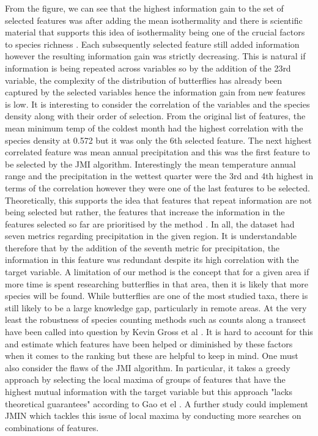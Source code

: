 \documentclass[prl,showpacs,superscriptaddress,twocolumn,longbibliography]{revtex4-1}
\begin{document}
From the figure, we can see that the highest information gain to the set of selected features was after adding the mean isothermality and there is scientific material that supports this idea of isothermality being one of the crucial factors to species richness \cite{rueda-m_environmental_2021}. Each subsequently selected feature still added information however the resulting information gain was strictly decreasing. This is natural if information is being repeated across variables so by the addition of the 23rd variable, the complexity of the distribution of butterflies has already been captured by the selected variables hence the information gain from new features is low. 
\newline
\newline
It is interesting to consider the correlation of the variables and the species density along with their order of selection. From the original list of features, the mean minimum temp of the coldest month had the highest correlation with the species density at 0.572 but it was only the 6th selected feature. The next highest correlated feature was mean annual precipitation and this was the first feature to be selected by the JMI algorithm. Interestingly the mean temperature annual range and the precipitation in the wettest quarter were the 3rd and 4th highest in terms of the correlation however they were one of the last features to be selected. Theoretically, this supports the idea that features that repeat information are not being selected but rather, the features that increase the information in the features selected so far are prioritised by the method \cite{afshar_dimensionality_2021}. In all, the dataset had seven metrics regarding precipitation in the given region. It is understandable therefore that by the addition of the seventh metric for precipitation, the information in this feature was redundant despite its high correlation with the target variable.
\newline
\newline
A limitation of our method is the concept that for a given area if more time is spent researching butterflies in that area, then it is likely that more species will be found. While butterflies are one of the most studied taxa, there is still likely to be a large knowledge gap, particularly in remote areas. At the very least the robustness of species counting methods such as counts along a transect have been called into question by Kevin Gross et al \cite{gross_robustness_2007}. It is hard to account for this and estimate which features have been helped or diminished by these factors when it comes to the ranking but these are helpful to keep in mind.  
\newline
\newline
One must also consider the flaws of the JMI algorithm. In particular, it takes a greedy approach by selecting the local maxima of groups of features that have the highest mutual information with the target variable but this approach "lacks theoretical guarantees" according to Gao et el \cite{gao_variational_2016}. A further study could implement JMIN which tackles this issue of local maxima by conducting more searches on combinations of features.
\end{document}
